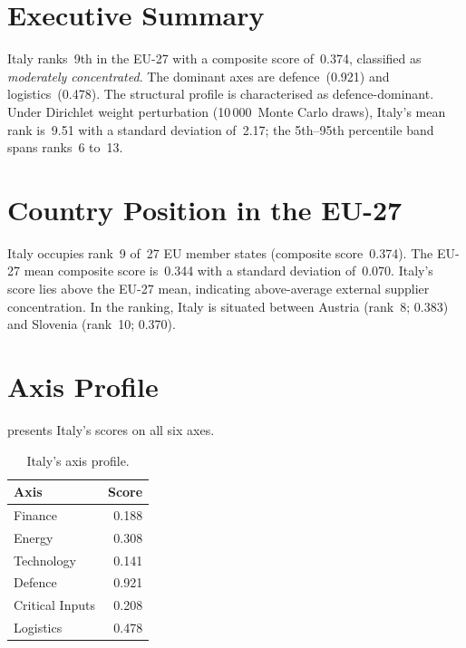 \documentclass[12pt,a4paper]{article}
\begin{document}
\hypersetup{pageanchor=true}
\pagestyle{fancy}
\renewcommand{\headrulewidth}{0.4pt}


\section{Executive Summary}
\label{sec:summary}

Italy ranks~9th in the EU-27 with a composite \ISI score of~0.374, classified as \emph{moderately concentrated}.  The dominant axes are defence~(0.921) and logistics~(0.478).  The structural profile is characterised as defence-dominant.  Under Dirichlet weight perturbation (10\,000~Monte Carlo draws), Italy's mean rank is~9.51 with a standard deviation of~2.17; the 5th--95th percentile band spans ranks~6 to~13.


\section{Country Position in the EU-27}
\label{sec:position}

Italy occupies rank~9 of~27 EU member states (composite score~0.374).  The EU-27 mean composite score is~0.344 with a standard deviation of~0.070.  Italy's score lies above the EU-27 mean, indicating above-average external supplier concentration.  In the ranking, Italy is situated between Austria (rank~8; 0.383) and Slovenia (rank~10; 0.370).


\section{Axis Profile}
\label{sec:axis-profile}

 presents Italy's scores on all six \ISI axes.

\begin{table}[htbp]
\centering\small
\caption{Italy's \ISI axis profile.}
\label{tab:axis-profile}
\begin{tabular}{@{}lr@{}}
\toprule
\textbf{Axis} & \textbf{Score} \\
\midrule
    Finance           & 0.188 \\
    Energy            & 0.308 \\
    Technology        & 0.141 \\
    Defence           & 0.921 \\
    Critical Inputs   & 0.208 \\
    Logistics         & 0.478 \\
\bottomrule
\end{tabular}
\end{table}
\end{document}
